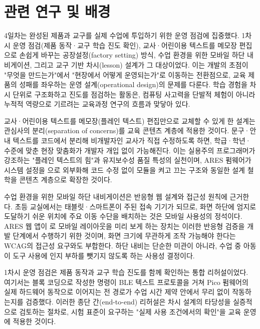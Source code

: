 

\section{관련 연구 및 배경}

4일차는 완성된 제품과 교구를 실제 수업에 투입하기 위한 운영 점검에 집중했다. 1차시 운영 점검(제품 동작·교구 학습 진도 확인), 교사·어린이용 텍스트를 메모장 편집으로 손쉽게 바꾸는 공장설정(factory setting) 방식, 수업 환경을 위한 모바일 하단 내비게이션, 그리고 교구 기반 차시(lesson) 설계가 그 대상이었다. 이는 개발의 초점이 "무엇을 만드는가"에서 "현장에서 어떻게 운영되는가"로 이동하는 전환점으로, 교육 제품의 성패를 좌우하는 운영 설계(operational design)의 문제를 다룬다. 학습 경험을 차시 단위로 구조화하고 진도를 점검하는 활동은, 컴퓨팅 사고력을 단발적 체험이 아니라 누적적 역량으로 기르려는 교육과정 연구의 흐름과 맞닿아 있다\cite{grover2013ct, brennan2012ct}.

교사·어린이용 텍스트를 메모장(플레인 텍스트) 편집만으로 교체할 수 있게 한 설계는 관심사의 분리(separation of concerns)를 교육 콘텐츠 계층에 적용한 것이다. 문구·안내 텍스트를 코드에서 분리해 비개발자인 교사가 직접 수정하도록 하면, 학급·학년·수준에 맞춘 현장 맞춤화가 개발자 개입 없이 가능해진다. 이는 실용주의 프로그래머가 강조하는 "플레인 텍스트의 힘"\cite{hunt1999pragmatic}과 유지보수성 품질 특성\cite{iso25010}의 실천이며, ARES 펌웨어가 시스템 설정을 으로 외부화해 코드 수정 없이 모듈을 켜고 끄는 구조\cite{ares-repo}와 동일한 설계 철학을 콘텐츠 계층으로 확장한 것이다.

수업 환경을 위한 모바일 하단 내비게이션은 반응형 웹 설계와 접근성 원칙에 근거한다. 초등 교실에서는 태블릿·스마트폰이 주된 접속 기기가 되므로, 화면 하단에 엄지로 도달하기 쉬운 위치에 주요 이동 수단을 배치하는 것은 모바일 사용성의 정석이다\cite{marcotte2010responsive, krug2014dontmakemethink}. ARES 웹 앱이 로 모바일 레이아웃을 미리 보게 하는 장치\cite{ares-repo}는 이러한 반응형 검증을 개발 단계에서 수행하기 위한 것이며, 화면 크기에 무관하게 조작 가능해야 한다는 WCAG의 접근성 요구\cite{wcag21}와도 부합한다. 하단 내비는 단순한 미관이 아니라, 수업 중 아동이 도구 사용에 인지 부하를 뺏기지 않도록 하는 사용성 결정이다\cite{nielsen1993usability, norman2013design}.

1차시 운영 점검은 제품 동작과 교구 학습 진도를 함께 확인하는 통합 리허설이었다. 여기서는 블록 코딩\cite{blockly, maloney2010scratch}으로 작성한 명령이 BLE 텍스트 프로토콜\cite{webbluetooth, bluetooth54}을 거쳐 Pico 펌웨어\cite{micropython, rp2040}의 실제 하드웨어 동작으로 이어지는 전 경로가 수업 시간 제약 안에서 무리 없이 작동하는지를 검증했다. 이러한 종단 간(end-to-end) 리허설은 차시 설계의 타당성을 실증적으로 검토하는 절차로, 시험 표준\cite{iso29119}이 요구하는 "실제 사용 조건에서의 확인"을 교육 운영에 적용한 것이다.

